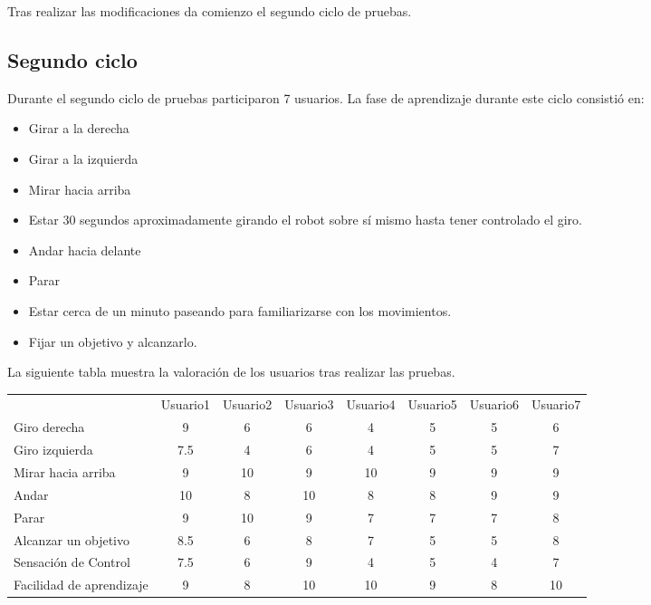 \documentclass[twoside, 12pt]{epstfg}
\begin{document}
Tras realizar las modificaciones da comienzo el segundo ciclo de pruebas.

\subsection{Segundo ciclo}

Durante el segundo ciclo de pruebas participaron 7 usuarios.
La fase de aprendizaje durante este ciclo consistió en:

\begin{itemize}
	\item Girar a la derecha
	\item Girar a la izquierda
	\item Mirar hacia arriba
	\item Estar 30 segundos aproximadamente girando el robot sobre sí mismo hasta tener controlado el giro.
	\item Andar hacia delante
	\item Parar
	\item Estar cerca de un minuto paseando para familiarizarse con los movimientos.
	\item Fijar un objetivo y alcanzarlo.
\end{itemize}

La siguiente tabla muestra la valoración de los usuarios tras realizar las pruebas.

\resizebox{15cm}{!} {
\begin{tabular}{|g  c  c  c  c  c  c  c |}
		\hline
	 \\ \hline
	& Usuario1 & Usuario2 & Usuario3 & Usuario4 & Usuario5 & Usuario6 & Usuario7\\
	
	Giro derecha & 9 & 6 & 6 & 4 & 5 & 5 & 6\\
	Giro izquierda & 7.5 & 4 & 6 & 4 & 5 & 5 & 7\\
	Mirar hacia arriba & 9 & 10 & 9 & 10 & 9 & 9 & 9\\
	Andar & 10 & 8 & 10 & 8 & 8 & 9 & 9\\
	Parar & 9 & 10 & 9 & 7 & 7 & 7 & 8\\
	Alcanzar un objetivo & 8.5 & 6 & 8 & 7 & 5 & 5 & 8\\
	Sensación de Control & 7.5 & 6 & 9 & 4 & 5 & 4 & 7\\
	Facilidad de aprendizaje & 9 & 8 & 10 & 10 & 9 & 8 & 10\\
	\hline
\end{tabular}
}
\end{document}
